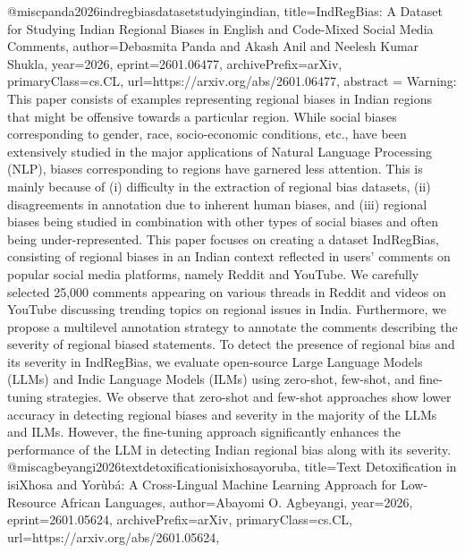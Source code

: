 {}@misc{panda2026indregbiasdatasetstudyingindian,
      title={IndRegBias: A Dataset for Studying Indian Regional Biases in English and Code-Mixed Social Media Comments}, 
      author={Debasmita Panda and Akash Anil and Neelesh Kumar Shukla},
      year={2026},
      eprint={2601.06477},
      archivePrefix={arXiv},
      primaryClass={cs.CL},
      url={https://arxiv.org/abs/2601.06477},
      abstract = {Warning: This paper consists of examples representing regional biases in Indian regions that might be offensive towards a particular region.   While social biases corresponding to gender, race, socio-economic conditions, etc., have been extensively studied in the major applications of Natural Language Processing (NLP), biases corresponding to regions have garnered less attention. This is mainly because of (i) difficulty in the extraction of regional bias datasets, (ii) disagreements in annotation due to inherent human biases, and (iii) regional biases being studied in combination with other types of social biases and often being under-represented. This paper focuses on creating a dataset IndRegBias, consisting of regional biases in an Indian context reflected in users' comments on popular social media platforms, namely Reddit and YouTube. We carefully selected 25,000 comments appearing on various threads in Reddit and videos on YouTube discussing trending topics on regional issues in India. Furthermore, we propose a multilevel annotation strategy to annotate the comments describing the severity of regional biased statements. To detect the presence of regional bias and its severity in IndRegBias, we evaluate open-source Large Language Models (LLMs) and Indic Language Models (ILMs) using zero-shot, few-shot, and fine-tuning strategies. We observe that zero-shot and few-shot approaches show lower accuracy in detecting regional biases and severity in the majority of the LLMs and ILMs. However, the fine-tuning approach significantly enhances the performance of the LLM in detecting Indian regional bias along with its severity.}
}@misc{agbeyangi2026textdetoxificationisixhosayoruba,
      title={Text Detoxification in isiXhosa and Yor\`ub\'a: A Cross-Lingual Machine Learning Approach for Low-Resource African Languages}, 
      author={Abayomi O. Agbeyangi},
      year={2026},
      eprint={2601.05624},
      archivePrefix={arXiv},
      primaryClass={cs.CL},
      url={https://arxiv.org/abs/2601.05624},
}
